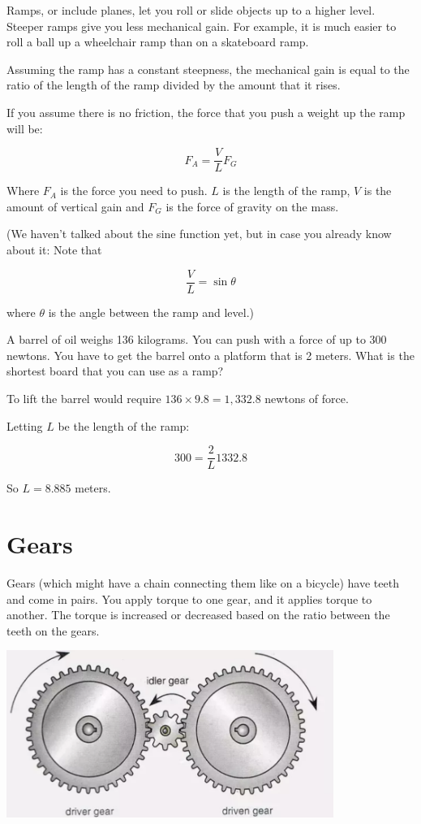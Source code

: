 Ramps, or include planes, let you roll or slide objects up to a higher
level. Steeper ramps give you less mechanical gain. For example, it is much easier 
to roll a ball up a wheelchair ramp than on a skateboard ramp.

Assuming the ramp has a constant steepness, the mechanical gain is
equal to the ratio of the length of the ramp divided by the amount
that it rises.

If you assume there is no friction, the force that you push a weight up the ramp will be:

$$F_A = \frac{V}{L} F_G$$

Where $F_A$ is the force you need to push. $L$ is the length of the
ramp, $V$ is the amount of vertical gain and $F_G$ is the force of
gravity on the mass.

(We haven't talked about the sine function yet, but in case you already know about it: Note that

$$\frac{V}{L} = \sin{\theta}$$

where $\theta$ is the angle between the ramp and level.)

\begin{Exercise}[title={Ramp}, label=ramp]
A barrel of oil weighs 136 kilograms. You can push with a force of
up to 300 newtons. You have to get the barrel onto a platform that is 2
meters. What is the shortest board that you can use as a ramp?
\end{Exercise}
\begin{Answer}[ref=ramp]
  To lift the barrel would require $136 \times 9.8 = 1,332.8$ newtons of force.

  Letting $L$ be the length of the ramp:

  $$300= \frac{2}{L} 1332.8$$

  So $L = 8.885$ meters.
\end{Answer}

\section{Gears}

Gears (which might have a chain connecting them like on a bicycle)
have teeth and come in pairs. You apply torque to one gear, and it
applies torque to another. The torque is increased or decreased based
on the ratio between the teeth on the gears.

\includegraphics[width=0.8\textwidth]{Gears.png}


